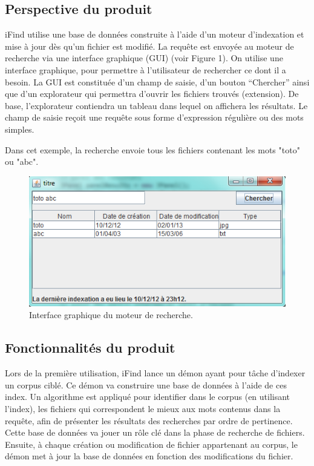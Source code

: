 \documentclass[a4paper,10pt]{article}
\begin{document}
\subsection{Perspective du produit}
iFind utilise une base de données construite à l'aide d'un moteur d'indexation
et mise à jour dès qu'un fichier est modifié. La requête est envoyée au moteur
de recherche via une interface graphique (GUI) (voir Figure 1). On utilise une
interface graphique, pour permettre à l’utilisateur de rechercher ce dont il a
besoin. La GUI est constituée d’un champ de saisie, d’un bouton “Chercher” ainsi
que d’un explorateur qui permettra d’ouvrir les fichiers trouvés (extension). De
base, l’explorateur contiendra un tableau dans lequel on affichera les
résultats. Le champ de saisie reçoit une requête sous forme d’expression
régulière ou des mots simples.

Dans cet exemple, la recherche envoie tous les fichiers contenant les mots
"toto" ou "abc".

\begin{figure}[!h]
\includegraphics[scale=0.7]{rechercheSimple.png}
\caption{Interface graphique du moteur de recherche.}
\end{figure}

\subsection{Fonctionnalités du produit}
Lors de la première utilisation, iFind lance un démon ayant pour tâche d’indexer
un corpus ciblé. 
Ce démon va construire une base de données à l’aide de ces index. Un algorithme
est appliqué pour identifier dans le corpus (en utilisant l'index), les fichiers
qui correspondent le mieux aux mots contenus dans la requête, afin de présenter
les résultats des recherches par ordre de pertinence. Cette base de données va
jouer un rôle clé dans la phase de recherche de fichiers.
Ensuite, à chaque création ou modification de fichier appartenant au corpus, le
démon met à jour la base de données en fonction des modifications du fichier.
\end{document}
